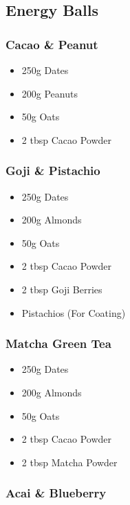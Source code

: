 \documentclass[11pt, english]{article}
\begin{document}
\newpage

	\subsection{Energy Balls}

		\subsubsection*{Cacao \& Peanut}

	\begin{itemize}
        \setlength\itemsep{0cm}
                \item 250g Dates
		\item 200g Peanuts
		\item 50g Oats
		\item 2 tbsp Cacao Powder
        \end{itemize}

		\subsubsection*{Goji \& Pistachio}

	\begin{itemize}
        \setlength\itemsep{0cm}
                \item 250g Dates
		\item 200g Almonds
		\item 50g Oats
		\item 2 tbsp Cacao Powder
		\item 2 tbsp Goji Berries
		\item Pistachios (For Coating)
        \end{itemize}

		\subsubsection*{Matcha Green Tea}

	\begin{itemize}
        \setlength\itemsep{0cm}
                \item 250g Dates
		\item 200g Almonds
		\item 50g Oats
		\item 2 tbsp Cacao Powder
		\item 2 tbsp Matcha Powder
        \end{itemize}

		\subsubsection*{Acai \& Blueberry}
\end{document}

